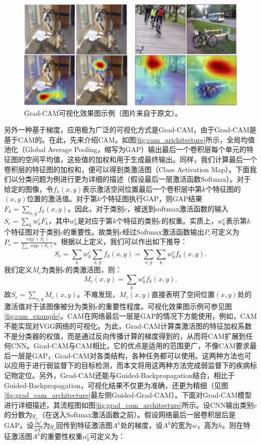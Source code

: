 \begin{figure}[h]
	\centering
	\includegraphics[width=1.0\textwidth]{figure/grad_cam_example}
	\caption{Grad-CAM可视化效果图示例（图片来自于原文）。} 
	\label{fig:grad_cam_example}
\end{figure}
另外一种基于梯度，应用极为广泛的可视化方式是Grad-CAM，由于Grad-CAM是基于CAM的。在此，先来介绍CAM。如图\ref{fig:cam_arichitecture}所示，全局均值池化（Global Average Pooling，缩写为GAP）输出最后一个卷积层每个单元的特征图的空间平均值，这些值的加权和用于生成最终输出。同样，我们计算最后一个卷积层的特征图的加权和，便可以得到类激活图（Class Activation Map）。下面我们以分类问题为例进行更为详细的描述（假设最后一层激活函数Softmax）。对于给定的图像，令$f_k(x, y)$表示激活空间位置最后一个卷积层中第$k$个特征图的$(x,y)$位置的激活值。对于第$k$个特征图执行GAP，则GAP结果$F_k=\sum_{x, y} f_{k}(x,y)$。因此，对于类别$c$，被送到softmax激活函数的输入$S_c=\sum_{k} w_{k}^{c} F_{k}$，其中$w_k^c$是对应于第$k$个特征的类别$c$的权重。实质上，$w_{k}^{c}$表示第$k$个特征图对于类别$c$的重要性。故类别$c$经过Softmax激活函数输出$P_c$可定义为$
P_c=\frac{\exp \left(S_{c}\right)}{\sum_{c} \exp \left(S_{c}\right)}$。根据以上定义，我们可以作出如下推导： 
\begin{equation*}
S_{c}=\sum_{k} w_{k}^{c} \sum_{x, y} f_{k}(x, y)=\sum_{x, y} \sum_{k} w_{k}^{c} f_{k}(x, y).
\end{equation*}
我们定义$M_c$为类别$c$的类激活图，则：
\begin{equation}\label{equ:cam_heatmap_compute}
M_{c}(x, y)=\sum_{k} w_{k}^{c} f_{k}(x, y).
\end{equation}
故$S_{c}=\sum_{x,y} M_{c}(x, y)$。不难发现，$M_{c}(x, y)$直接表明了空间位置$(x,y)$处的激活值对于该图像被分为类别$c$的重要性程度。可视化效果图示例可参见图\ref{fig:cam_example}。CAM在网络最后一层是GAP的情况下方能使用，例如，CAM不能实现对VGG网络的可视化。为此，Grad-CAM计算类激活图的特征加权系数不是分类器的权值，而是通过反向传播计算的梯度得到的，从而将CAM扩展到任何CNN。Grad-CAM与CAM相比，它的优点是适用的范围更广，不像CAM要求最后一层是GAP，Grad-CAM对各类结构，各种任务都可以使用。这两种方法也可以应用于进行弱监督下的目标检测，而本文将用这两种方法完成弱监督下的疾病标记物定位。另外，Grad-CAM还能与Guided-Backpropagation结合，相比于Guided-Backpropagation，可视化结果不仅更为准确，还更为精细（见图\ref{fig:grad_cam_architecture}最左侧Guided-Grad-CAM）。下面对Grad-CAM模型进行详细描述，其流程图如图\ref{fig:grad_cam_architecture}所示。设CNN输出类别$c$的分数为$y_c$（在送入Softmax激活函数之前）。假设网络最后一层卷积层后是GAP。设$\frac{\partial y^{c}}{\partial A^{k}}$为$y_c$回传到特征激活图$A^{k}$处的梯度，设$A^{k}$的宽为$w$，高为$h$。则在特征激活图$A^{k}$的重要性权重$\alpha_{k}^{c}$可定义为：
